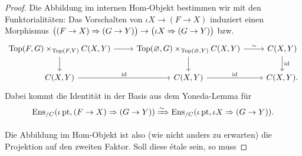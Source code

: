 \begin{proof}
  Die Abbildung im internen Hom-Objekt bestimmen wir mit den
  Funktorialitäten: Das Vorschalten von $\iota X \to (F \to X)$
  induziert einen Morphismus $\big( (F \to X) \Rightarrow (G \to Y) \big)
  \to \big( \iota X \Rightarrow (G \to Y) \big)$ bzw.
  \[ \begin{tikzcd}
    \Top(F, G) \times_{\Top(F, Y)} C(X, Y) \dar \rar
    & \Top(\varnothing, G) \times_{\Top(\varnothing, Y)} C(X, Y) \dar \rar{\sim}
    & C(X, Y) \dar{\id} \\
    C(X, Y) \rar{\id}
    & C(X, Y) \rar{\id}
    & C(X, Y).
  \end{tikzcd} \]
  Dabei kommt die Identität in der Basis aus dem Yoneda-Lemma für
  \[ \operatorname{Ens}_{/C}(\iota \operatorname{pt}, (F \to X) \Rightarrow (G \to Y))
  \xRightarrow{\sim} \operatorname{Ens}_{/C}(\iota \operatorname{pt}, \iota X \Rightarrow (G \to Y)). \]

  Die Abbildung im Hom-Objekt ist also (wie nicht anders zu erwarten)
  die Projektion auf den zweiten Faktor. Soll diese étale sein, so
  muss %

\end{proof}
  







